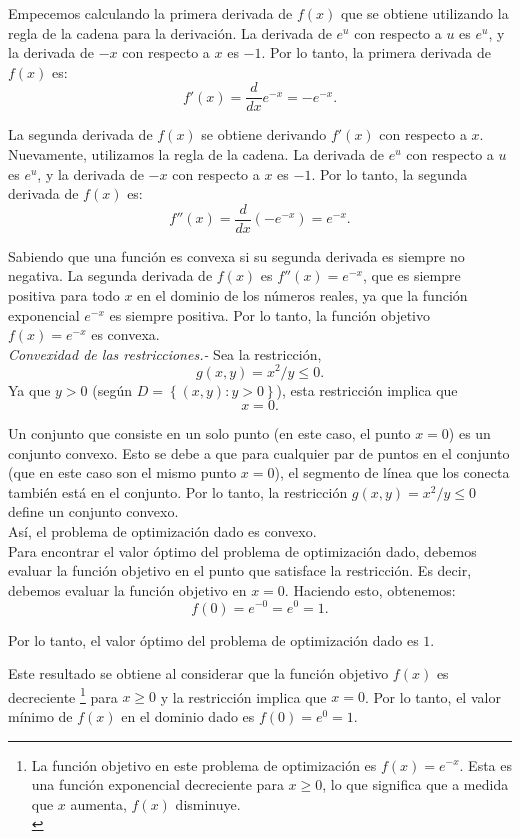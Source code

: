 \begin{enumerate}
\begin{enumerate}[(a)]
	    Empecemos calculando la primera derivada de $f(x)$ que se obtiene utilizando la regla de la cadena para la derivación. La derivada de $e^u$ con respecto a $u$ es $e^u$, y la derivada de $-x$ con respecto a $x$ es $-1$. Por lo tanto, la primera derivada de $f(x)$ es:
	    $$f'(x) = \frac{d}{dx} e^{-x} = -e^{-x}.$$

	    La segunda derivada de $f(x)$ se obtiene derivando $f'(x)$ con respecto a $x$. Nuevamente, utilizamos la regla de la cadena. La derivada de $e^u$ con respecto a $u$ es $e^u$, y la derivada de $-x$ con respecto a $x$ es $-1$. Por lo tanto, la segunda derivada de $f(x)$ es:
	    $$f''(x) = \frac{d}{dx} (-e^{-x}) = e^{-x}.$$

	    Sabiendo que una función es convexa si su segunda derivada es siempre no negativa. La segunda derivada de $f(x)$ es $f''(x) = e^{-x}$, que es siempre positiva para todo $x$ en el dominio de los números reales, ya que la función exponencial $e^{-x}$ es siempre positiva. Por lo tanto, la función objetivo $f(x) = e^{-x}$ es convexa.\\

	    \textit{Convexidad de las restricciones.-} Sea la restricción,
	    $$g(x,y) = x^2/y \leq 0.$$ 
	     Ya que $y > 0$ (según $D=\left\{(x,y):y>0\right\}$), esta restricción implica que 
	     $$x = 0.$$ 

	    Un conjunto que consiste en un solo punto (en este caso, el punto $x = 0$) es un conjunto convexo. Esto se debe a que para cualquier par de puntos en el conjunto (que en este caso son el mismo punto $x = 0$), el segmento de línea que los conecta también está en el conjunto. Por lo tanto, la restricción $g(x,y) = x^2/y \leq 0$ define un conjunto convexo.\\

	    Así, el problema de optimización dado es convexo.\\

	    Para encontrar el valor óptimo del problema de optimización dado, debemos evaluar la función objetivo en el punto que satisface la restricción. Es decir, debemos evaluar la función objetivo en $x = 0$. Haciendo esto, obtenemos:
	    $$f(0) = e^{-0} = e^0 = 1.$$

	    Por lo tanto, el valor óptimo del problema de optimización dado es $1$.

	    Este resultado se obtiene al considerar que la función objetivo $f(x)$ es decreciente
	    \footnote{
		La función objetivo en este problema de optimización es $f(x) = e^{-x}$. Esta es una función exponencial decreciente para $x \geq 0$, lo que significa que a medida que $x$ aumenta, $f(x)$ disminuye.\\
	    }
	    para $x \geq 0$ y la restricción implica que $x = 0$. Por lo tanto, el valor mínimo de $f(x)$ en el dominio dado es $f(0) = e^0 = 1$.


\end{enumerate}
\end{enumerate}
